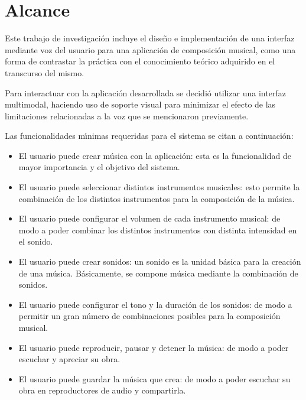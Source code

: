 \section{Alcance}
\label{sec:problema-especifico}

Este trabajo de investigaci\'on incluye el dise\~no e implementaci\'on de
una interfaz mediante voz del usuario para una aplicaci\'on de composici\'on musical,
como una forma de contrastar la pr\'actica con el conocimiento te\'orico adquirido en
el transcurso del mismo.

Para interactuar con la aplicaci\'on desarrollada se decidi\'o utilizar una interfaz
multimodal, haciendo uso de soporte visual para minimizar el efecto de las limitaciones
relacionadas a la voz que se mencionaron previamente.

Las funcionalidades m{\'\i}nimas requeridas para el sistema se citan a continuación:
\begin{itemize}
	\item El usuario puede crear música con la aplicación: esta es la funcionalidad de
    mayor importancia y el objetivo del sistema.
	\item El usuario puede seleccionar distintos instrumentos musicales: esto
    permite la combinación de los distintos instrumentos para la composición de la música.
	\item El usuario puede configurar el volumen de cada instrumento musical: de
    modo a poder combinar los distintos instrumentos con distinta intensidad en el
    sonido.
	\item El usuario puede crear sonidos: un sonido es la unidad básica para la
    creación de una música. Básicamente, se compone música mediante la combinación
    de sonidos.
	\item El usuario puede configurar el tono y la duración de los sonidos: de modo
    a permitir un gran número de combinaciones posibles para la composición musical.
	\item El usuario puede reproducir, pausar y detener la música: de modo a poder
    escuchar y apreciar su obra.
	\item El usuario puede guardar la música que crea: de modo a poder escuchar
    su obra en reproductores de audio y compartirla.
\end{itemize}